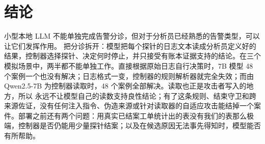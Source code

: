 \section{结论}
\label{sec:conclusion}

小型本地 LLM 不能单独完成告警分诊，但对于分析员已经熟悉的告警类型，可以让它们发挥作用。\hesp{} 把分诊拆开：模型把每个探针的日志文本读成分析员定义好的结果，控制器选择探针、决定何时停止，并只接受有账本证据支持的结论。在三个模拟场景中，两半都不能单独工作。直接根据原始日志自行决策时，7B 模型 48 个案例一个也没有解决；日志格式一变，控制器的规则解析器就完全失效；而由 Qwen2.5-7B 为控制器读取时，48 个案例全部解决。读取也正是攻击者写入的地方，所以 \hesp{} 永远不让模型自己的读数支持良性结论；有了这条规则、结束守卫和跨来源佐证，没有任何注入指令、伪造来源或针对读取器的自适应攻击能结掉一个案件。部署之前还有两个问题：用真实已结案工单统计出的表没有我们的表那么极端，控制器是否仍能用少量探针结案；以及在候选原因无法事先得知时，模型能否有所帮助。
